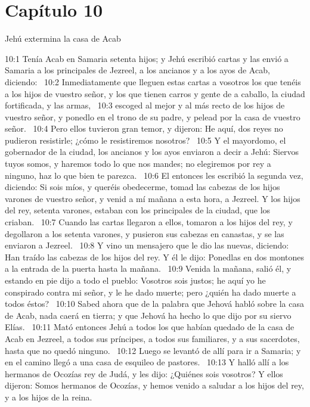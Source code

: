 \section*{Capítulo 10 }
Jehú extermina la casa de Acab  

10:1 Tenía Acab en Samaria setenta hijos; y Jehú escribió cartas y las envió a Samaria a los principales de Jezreel, a los ancianos y a los ayos de Acab, diciendo:  
10:2 Inmediatamente que lleguen estas cartas a vosotros los que tenéis a los hijos de vuestro señor, y los que tienen carros y gente de a caballo, la ciudad fortificada, y las armas,  
10:3 escoged al mejor y al más recto de los hijos de vuestro señor, y ponedlo en el trono de su padre, y pelead por la casa de vuestro señor.  
10:4 Pero ellos tuvieron gran temor, y dijeron: He aquí, dos reyes no pudieron resistirle; ¿cómo le resistiremos nosotros?  
10:5 Y el mayordomo, el gobernador de la ciudad, los ancianos y los ayos enviaron a decir a Jehú: Siervos tuyos somos, y haremos todo lo que nos mandes; no elegiremos por rey a ninguno, haz lo que bien te parezca.  
10:6 El entonces les escribió la segunda vez, diciendo: Si sois míos, y queréis obedecerme, tomad las cabezas de los hijos varones de vuestro señor, y venid a mí mañana a esta hora, a Jezreel. Y los hijos del rey, setenta varones, estaban con los principales de la ciudad, que los criaban.  
10:7 Cuando las cartas llegaron a ellos, tomaron a los hijos del rey, y degollaron a los setenta varones, y pusieron sus cabezas en canastas, y se las enviaron a Jezreel.  
10:8 Y vino un mensajero que le dio las nuevas, diciendo: Han traído las cabezas de los hijos del rey. Y él le dijo: Ponedlas en dos montones a la entrada de la puerta hasta la mañana.  
10:9 Venida la mañana, salió él, y estando en pie dijo a todo el pueblo: Vosotros sois justos; he aquí yo he conspirado contra mi señor, y le he dado muerte; pero ¿quién ha dado muerte a todos éstos?  
10:10 Sabed ahora que de la palabra que Jehová habló sobre la casa de Acab, nada caerá en tierra; y que Jehová ha hecho lo que dijo por su siervo Elías.  
10:11 Mató entonces Jehú a todos los que habían quedado de la casa de Acab en Jezreel, a todos sus príncipes, a todos sus familiares, y a sus sacerdotes, hasta que no quedó ninguno.  
10:12 Luego se levantó de allí para ir a Samaria; y en el camino llegó a una casa de esquileo de pastores.  
10:13 Y halló allí a los hermanos de Ocozías rey de Judá, y les dijo: ¿Quiénes sois vosotros? Y ellos dijeron: Somos hermanos de Ocozías, y hemos venido a saludar a los hijos del rey, y a los hijos de la reina.  
